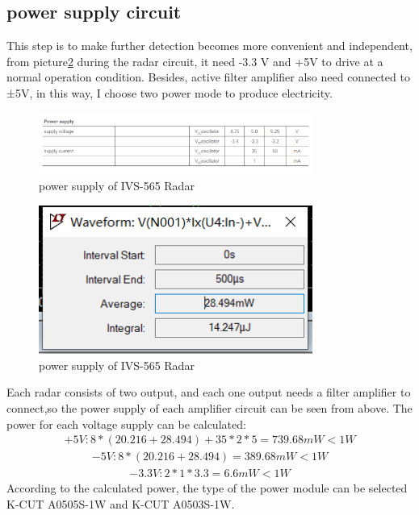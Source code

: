 \subsection{power supply circuit}
This step is to make further detection becomes more convenient and independent, from picture\ref{fig:power_radar} during the radar circuit, it need -3.3 V and +5V to drive at a normal operation condition. Besides, active filter amplifier also need connected to ±5V, in this way, I choose two power mode to produce electricity.
\begin{figure}[H]
    \centering
    \includegraphics[width=0.8\textwidth]{figure/powersupplyofIVS565Radar.png}
    \caption{power supply of IVS-565 Radar}
    \label{fig:power_radar}
\end{figure}
\begin{figure}[H]
    \centering
    \includegraphics[width=0.8\textwidth]{figure/powerAM2.png}
    \caption{power supply of IVS-565 Radar}
    \label{fig:power_radar}
\end{figure}
Each radar consists of two output, and each one output needs a filter amplifier to connect,so the power supply of each amplifier circuit can be seen from above.
The power for each voltage supply can be calculated:
\begin{align}
+5 V: 8 *(20.216+28.494)+35 * 2 * 5=739.68 m W<1 W
\end{align}
\begin{align}
-5 V: 8 *(20.216+28.494)=389.68 m W<1 W
\end{align}
\begin{align}
-3.3 V: 2 * 1 * 3.3=6.6 m W<1 W
\end{align}
According to the calculated power, the type of the power module can be selected K-CUT A0505S-1W and K-CUT A0503S-1W.

